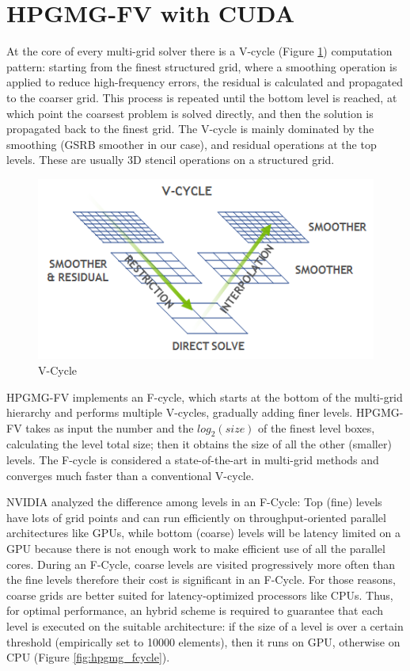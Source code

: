 \documentclass[conference]{IEEEtran}
\begin{document}
\section{HPGMG-FV with CUDA}\label{sec:hpgmg_cuda}

At the core of every multi-grid solver there is a V-cycle (Figure \ref{fig:hpgmg_vcycle}) computation pattern: starting from the finest structured grid, where a smoothing operation is applied to reduce high-frequency errors, the residual is calculated and propagated to the coarser grid. This process is repeated until the bottom level is reached, at which point the coarsest problem is solved directly, and then the solution is propagated back to the finest grid. The V-cycle is mainly dominated by the smoothing (GSRB smoother in our case), and residual operations at the top levels. These are usually 3D stencil operations on a structured grid.

\begin{figure}[h]
\includegraphics[scale=0.7]{hpgmg_v_cycle.png}
\caption{V-Cycle}
\label{fig:hpgmg_vcycle}
\end{figure}

HPGMG-FV implements an F-cycle, which starts at the bottom of the multi-grid hierarchy and performs multiple V-cycles, gradually adding finer levels. 
HPGMG-FV takes as input the number and the $log_2(size)$ of the finest level boxes, calculating the level total size; then it obtains the size of all the other (smaller) levels.
The F-cycle is considered a state-of-the-art in multi-grid methods and converges much faster than a conventional V-cycle.

NVIDIA analyzed the difference among levels in an F-Cycle: Top (fine) levels have lots of grid points and can run efficiently on throughput-oriented parallel architectures like GPUs, while bottom (coarse) levels will be latency limited on a GPU because there is not enough work to make efficient use of all the parallel cores. During an F-Cycle, coarse levels are visited progressively more often than the fine levels therefore their cost is significant in an F-Cycle. For those reasons, coarse grids are better suited for latency-optimized processors like CPUs.
Thus, for optimal performance, an hybrid scheme is required to guarantee that each level is executed on the suitable architecture: if the size of a level is over a certain threshold (empirically set to 10000 elements), then it runs on GPU, otherwise on CPU (Figure \ref{fig:hpgmg_fcycle}).
\end{document}
